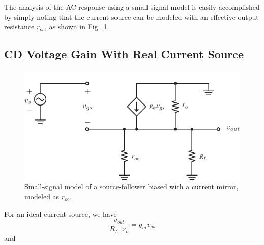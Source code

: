 The analysis of the AC response using a small-signal model is easily accomplished by simply noting that the current source can be modeled with an effective output resistance $r_{oc}$, as shown in Fig.~\ref{fig:cd_amp_ss_av.pdf}.
 




\subsection{CD Voltage Gain With Real Current Source}

\begin{figure}[tb]
\begin{center}
\includegraphics[scale=1]{cd_amp_ss_av.pdf}
\end{center}
\caption{Small-signal model of a source-follower biased with a current mirror, modeled as $r_{oc}$.} \label{fig:cd_amp_ss_av.pdf}
\end{figure}


For an ideal current source, we have
\begin{equation}
	\frac{{{v_{out}}}}{{{R_L}||{r_o}}} = {g_m}{v_{gs}}
\end{equation}
and

